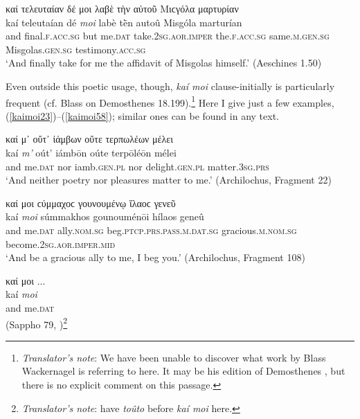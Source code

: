 \begin{exe}
\ex καί τελευταίαν δέ μοι λαβὲ τὴν αὐτοῦ Μιϲγόλα μαρτυρίαν\\
\gll kaí teleutaían dé \emph{moi} labè tḕn autoû Misgóla marturían\\
and final.\textsc{f.acc.sg} but me.\textsc{dat}
take.\textsc{2sg.aor.imper} the.\textsc{f.acc.sg} same.\textsc{m.gen.sg} Misgolas.\textsc{gen.sg} testimony.\textsc{acc.sg}\\
\trans `And finally take for me the affidavit of Misgolas himself.' (Aeschines 1.50)
\label{kaimoi22}
\end{exe}

Even outside this poetic usage, though, \textit{kaí moi} clause-initially is particularly frequent (cf. Blass on Demosthenes 18.199).\footnote{\emph{Translator's note}: We have been unable to discover what work by Blass Wackernagel is referring to here. It may be his edition of Demosthenes \citep[306--307]{DindorfBlass1887}, but there is no explicit comment on this passage.} Here I give just a few examples, (\ref{kaimoi23})--(\ref{kaimoi58}); similar ones can be found in any text. 

\begin{exe}
\ex καί μ᾽ οὔτ᾽ ἰάμβων οὔτε τερπωλέων μέλει\\
\gll kaí \emph{m'} oút' iámbōn oúte terpōléōn mélei\\
and me.\textsc{dat} nor iamb.\textsc{gen.pl} nor
delight.\textsc{gen.pl} matter.\textsc{3sg.prs}\\
\trans `And neither poetry nor pleasures matter to me.' (Archilochus, Fragment 22)
\label{kaimoi23}
\end{exe}

\begin{exe}
\ex καί μοι ϲύμμαχοϲ γουνουμένῳ ἵλαοϲ γενεῦ\\
\gll kaí \emph{moi} súmmakhos gounouménōi hílaos geneû\\
and me.\textsc{dat} ally.\textsc{nom.sg}
beg.\textsc{ptcp.prs.pass.m.dat.sg} gracious.\textsc{m.nom.sg} become.\textsc{2sg.aor.imper.mid}\\
\trans `And be a gracious ally to me, I beg you.' (Archilochus, Fragment 108)
\label{kaimoi24}
\end{exe}

\begin{exe}
\ex καί μοι ...\\
\gll kaí \emph{moi}\\
and me.\textsc{dat}\\
\trans (Sappho 79, \citealp[58.25]{LobelPage1968})\footnote{\emph{Translator's note}: \citet{LobelPage1968} have \textit{toûto} before \textit{kaí \emph{moi}} here.}\\
\label{kaimoi25}
\end{exe}


